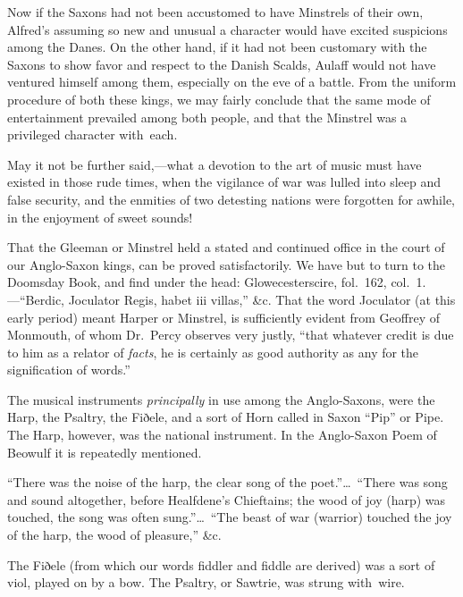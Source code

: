 Now if the Saxons had not been accustomed to have Minstrels of their own,
Alfred’s assuming so new and unusual a character would have excited suspicions
among the Danes. On the other hand, if it had not been customary with the
Saxons to show favor and respect to the Danish Scalds, Aulaff would not have
ventured himself among them, especially on the eve of a battle. From the
uniform procedure of both these kings, we may fairly conclude that the same
mode of entertainment prevailed among both people, and that the Minstrel was
a privileged character with~each.

May it not be further said,—what a devotion to the art of music must have
existed in those rude times, when the vigilance of war was lulled into sleep and
false security, and the enmities of two detesting nations were forgotten for
awhile, in the enjoyment of sweet sounds!

That the Gleeman or Minstrel held a stated and continued office in the court
of our Anglo-Saxon kings, can be proved satisfactorily. We have but to turn to
the Doomsday Book, and find under the head: Glowecesterscire, fol.~162, col.~1.—“Berdic, 
Joculator Regis, habet iii villas,” \&c. That the word Joculator (at
this early period) meant Harper or Minstrel, is sufficiently evident from Geoffrey 
of Monmouth, of whom Dr.~Percy observes \pagebreak
very justly, “that whatever credit is 
due to him as a relator of
\textit{facts}, he is certainly as good authority as any for the 
signification of words.”



The musical instruments \textit{principally} in use among the Anglo-Saxons, were the
Harp, the Psaltry, the Fiðele, and a sort of Horn called in Saxon “Pip” or
Pipe. The Harp, however, was the national instrument. In the Anglo-Saxon
Poem of Beowulf it is repeatedly mentioned.

“There was the noise of the harp, the clear song of the poet.”\ldots\ “There
was song and sound altogether, before Healfdene’s Chieftains; the wood of joy
(harp) was touched, the song was often sung.”\ldots\  “The beast of war (warrior)
touched the joy of the harp, the wood of pleasure,” \&c.

The Fiðele (from which our words fiddler and fiddle are derived) was a sort of
viol, played on by a bow. The Psaltry, or Sawtrie, was strung with~wire. %

